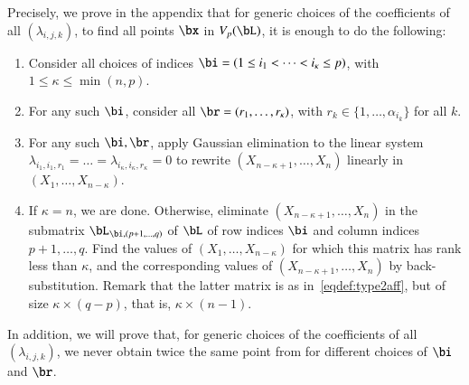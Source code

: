 \documentclass[amsthm]{elsart}
\begin{document}
Precisely, we prove in the appendix that for generic choices of the
coefficients of all $(\lambda_{i,j,k})$, to find all points
$\bx$ in $V_p(\bL)$, it is enough to do the following:
\begin{enumerate}
\item Consider all choices of indices $\bi = (1\le i_1 < \dots <
  i_\kappa\le p)$, with $1 \leq \kappa \leq\min(n,p)$.
\item For any such $\bi$, consider all $\br = (r_1,\dots,r_\kappa)$,
  with $r_k \in \{1,\dots,\alpha_{i_k}\}$ for all $k$.
\item For any such $\bi,\br$, apply Gaussian elimination to the linear
  system
  $\lambda_{i_1,i_1,r_1}=\dots=\lambda_{i_\kappa,i_\kappa,r_\kappa}=0$
  to rewrite $(X_{n-\kappa+1}, \ldots, X_n)$  linearly in $(X_1,
  \ldots, X_{n-\kappa})$.
\item If $\kappa = n$, we are done. Otherwise, 
  eliminate $(X_{n-\kappa+1}, \ldots, X_n)$ in the submatrix
  $\bL_{\bi,(p+1, \ldots, q)}$ of $\bL$ of row indices $\bi$ and
  column indices $p+1,\dots,q$. Find the values of $(X_1, \ldots,
  X_{n-\kappa})$ for which this matrix has rank less than $\kappa$,
  and the corresponding values of $(X_{n-\kappa+1}, \ldots, X_n)$ by
  back-substitution. Remark that the latter matrix is as
  in~\eqref{eqdef:type2aff}, but of size $\kappa \times (q-p)$, that
  is, $ \kappa\times (n-1)$.
\end{enumerate}
In addition, we will prove that, for generic choices of the
coefficients of all $(\lambda_{i,j,k})$, we never obtain 
twice the same point from for different choices of $\bi$ and $\br$.
\end{document}
